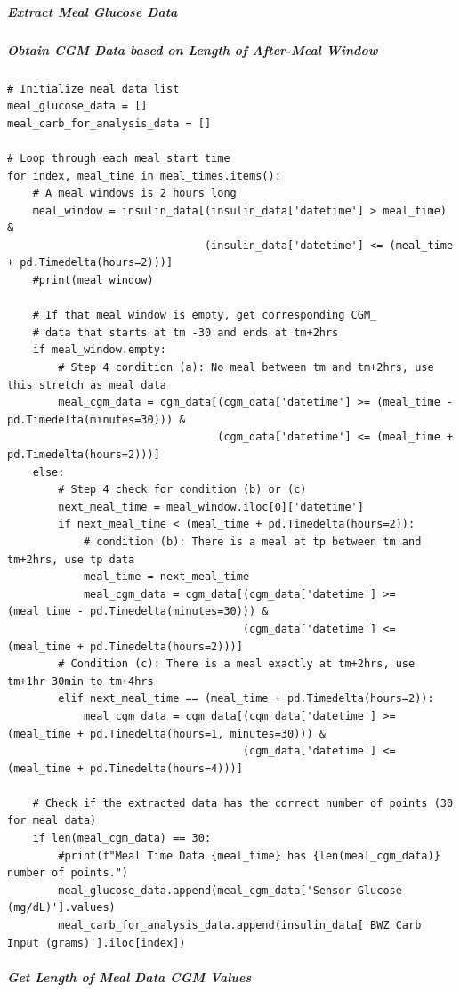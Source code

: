 \subparagraph{Extract Meal Glucose Data}

\subparagraph{Obtain CGM Data based on Length of After-Meal Window}

\begin{verbatim}
# Initialize meal data list
meal_glucose_data = []
meal_carb_for_analysis_data = []

# Loop through each meal start time
for index, meal_time in meal_times.items():
    # A meal windows is 2 hours long
    meal_window = insulin_data[(insulin_data['datetime'] > meal_time) & 
                               (insulin_data['datetime'] <= (meal_time + pd.Timedelta(hours=2)))]
    #print(meal_window)

    # If that meal window is empty, get corresponding CGM_
    # data that starts at tm -30 and ends at tm+2hrs
    if meal_window.empty:
        # Step 4 condition (a): No meal between tm and tm+2hrs, use this stretch as meal data
        meal_cgm_data = cgm_data[(cgm_data['datetime'] >= (meal_time - pd.Timedelta(minutes=30))) & 
                                 (cgm_data['datetime'] <= (meal_time + pd.Timedelta(hours=2)))]
    else:
        # Step 4 check for condition (b) or (c)
        next_meal_time = meal_window.iloc[0]['datetime']
        if next_meal_time < (meal_time + pd.Timedelta(hours=2)):
            # condition (b): There is a meal at tp between tm and tm+2hrs, use tp data
            meal_time = next_meal_time
            meal_cgm_data = cgm_data[(cgm_data['datetime'] >= (meal_time - pd.Timedelta(minutes=30))) & 
                                     (cgm_data['datetime'] <= (meal_time + pd.Timedelta(hours=2)))]
        # Condition (c): There is a meal exactly at tm+2hrs, use tm+1hr 30min to tm+4hrs
        elif next_meal_time == (meal_time + pd.Timedelta(hours=2)):
            meal_cgm_data = cgm_data[(cgm_data['datetime'] >= (meal_time + pd.Timedelta(hours=1, minutes=30))) & 
                                     (cgm_data['datetime'] <= (meal_time + pd.Timedelta(hours=4)))]

    # Check if the extracted data has the correct number of points (30 for meal data)
    if len(meal_cgm_data) == 30:
        #print(f"Meal Time Data {meal_time} has {len(meal_cgm_data)} number of points.")
        meal_glucose_data.append(meal_cgm_data['Sensor Glucose (mg/dL)'].values)
        meal_carb_for_analysis_data.append(insulin_data['BWZ Carb Input (grams)'].iloc[index])
\end{verbatim}

\subparagraph{Get Length of Meal Data CGM Values}

